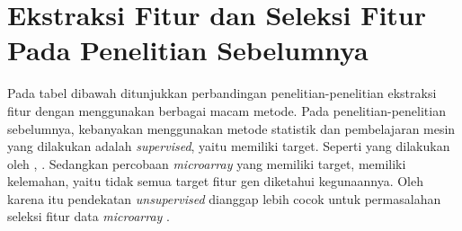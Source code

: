\section{Ekstraksi Fitur dan Seleksi Fitur Pada Penelitian Sebelumnya}
Pada tabel dibawah ditunjukkan perbandingan penelitian-penelitian ekstraksi fitur dengan menggunakan berbagai macam metode. Pada penelitian-penelitian sebelumnya, kebanyakan menggunakan metode statistik dan pembelajaran mesin yang dilakukan adalah \textit{supervised}, yaitu memiliki target. Seperti yang dilakukan oleh \citep{aliferis2003machine}, \cite{ramaswamy2001multiclass}. Sedangkan percobaan \textit{microarray} yang memiliki target, memiliki kelemahan, yaitu tidak semua target fitur gen diketahui kegunaannya. Oleh karena itu pendekatan \textit{unsupervised} dianggap lebih cocok untuk permasalahan seleksi fitur data \textit{microarray} \citep{haggstrom2014diagram}.
